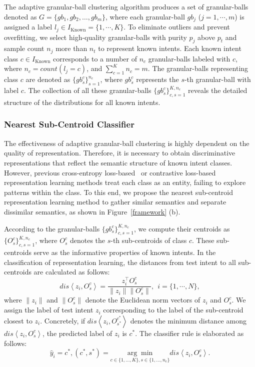 \documentclass[letterpaper]{article} %
\theoremstyle{definition}
\begin{document}
The adaptive granular-ball clustering algorithm produces a set of granular-balls denoted as $G = \{gb_1, gb_2, \ldots, gb_m\}$, where each granular-ball $gb_j$ ($j=1,\cdots,m$) is assigned a label $l_j \in I_{\text{Known}}=\{1,\cdots, K\}$. 
To eliminate outliers and prevent overfitting, we select high-quality granular-balls with purity $p_j$ above $p_t$ and sample count $n_j$ more than $n_t$ to represent known intents.
Each known intent class $c \in I_{\text{Known}}$ corresponds to a number of $n_c$ granular-balls labeled with $c$, where $n_c=count(l_j=c)$, and $\sum_{c=1}^{K} n_c =m$. The granular-balls representing class $c$ are denoted as $\{gb_{s}^{c} \}_{s=1}^{n_c}$, where $gb_{s}^{c}$ represents the $s$-th granular-ball with label $c$. The collection of all these granular-balls $\{gb_{s}^{c}\}_{c,s=1}^{K,n_c}$ reveals the detailed structure of the distributions for all known intents. 

\subsubsection{Nearest Sub-Centroid Classifier}
The effectiveness of adaptive granular-ball clustering is highly dependent on the quality of representation. Therefore, it is necessary to obtain discriminative representations that reflect the semantic structure of known intent classes.
However, previous cross-entropy loss-based~\cite{zhang2021deep} or contrastive loss-based~\cite{liu2023effective} representation learning methods treat each class as an entity, failing to explore patterns within the class.
To this end, we propose the nearest sub-centroid representation learning method to gather similar semantics and separate dissimilar semantics, as shown in Figure~\ref{framework} (b).


According to the granular-balls $\{gb_{s}^{c}\}_{c,s=1}^{K,n_c}$, we compute their centroids as $\{O_{s}^{c} \}_{c,s=1}^{K,n_c}$, where $O_{s}^{c}$ denotes the $s$-th sub-centroids of class $c$. 
These sub-centroids serve as the informative properties of known intents.
In the classification of representation learning, the distances from test intent to all sub-centroids are calculated as follows:
\begin{equation}
   dis\left\langle z_i, O_{s}^{c} \right\rangle = \frac{ z_i^\top O_{s}^{c}}{\| z_i\| \|O_{s}^{c}\|}, \ \ i=\{1,\cdots,N\},
\end{equation}
where $\|z_i\|$ and $\|O_{s}^{c}\|$ denote the Euclidean norm vectors of $z_i$ and $O_{s}^{c}$. We assign the label of test intent $z_i$ corresponding to the label of the sub-centroid closest to $z_i$. 
Concretely, if $ dis\left\langle z_i, O_{s^*}^{c^*} \right\rangle$ denotes the minimum distance among $ dis\left\langle z_i, O_{s}^{c} \right\rangle$, the predicted label of $z_{i}$ is $c^*$. The classifier rule is elaborated as follows:
\begin{equation}
\hat{y}_i = c^*,(c^*, s^*) = \underset{ c \in \{1, \dots, K\}, s \in \{1, \dots, n_c\} }{\arg\min}  dis\left\langle z_i, O_{s}^{c} \right\rangle.
\end{equation}
\end{document}
